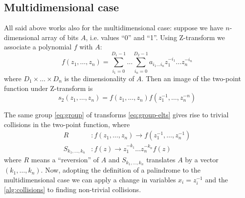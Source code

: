 \documentclass[12pt, a4paper]{article}
\begin{document}
\subsection{Multidimensional case}
All said above works also for the multidimensional case: suppose we have
$n$-dimensional array of bits $A$, i.e. values ``0'' and ``1''. Using
Z-transform we associate a polynomial $f$ with $A$:
\begin{equation*}
  f(z_1, \dots, z_n) = \sum_{i_1=0}^{D_1 - 1} \dots \sum_{i_n=0}^{D_2 - 1}
  a_{i_1\dots i_n} z_1^{-i_1} \dots z_n^{-i_n}
\end{equation*}
where $D_1 \times \dots \times D_n$ is the dimensionality of $A$. Then an image
of the two-point function under Z-transform is
\begin{equation}
  s_2(z_1, \dots, z_n) = f(z_1, \dots, z_n)f(z_1^{-1}, \dots, z_n^{-n})
  \label{eq:s2z-md}
\end{equation}

The same group \cref{eq:group} of transforms \cref{eq:group-elts} gives rise to
trivial collisions in the two-point function, where
\begin{equation}
  \begin{aligned}
    R&: f(z_1, \dots, z_n) \rightarrow f(z_1^{-1}, \dots, z_n^{-1}) \\
    S_{k_1, \dots, k_n}&: f(z) \rightarrow z_1^{-k_1}\dots z_n^{-k_n}f(z)
  \end{aligned}
  \label{eq:group-elts-md}
\end{equation}
where $R$ means a ``reversion'' of $A$ and $S_{k_1, \dots, k_n}$ translates $A$
by a vector $(k_1, \dots, k_n)$. Now, adopting the definition of a palindrome to
the multidimensional case we can apply a change in variables $x_i = z_i^{-1}$
and the \cref{alg:collisions} to finding non-trivial collisions.
\end{document}
